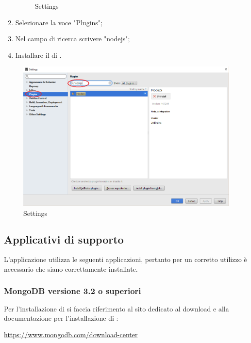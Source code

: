 \documentclass[12pt,a4paper]{article}
\begin{document}
\begin{enumerate}
\begin{center}
\begin{figure}[H]
				\caption{Settings}
			\end{figure}
		\end{center}

		\item Selezionare la voce "Plugins";
		\item Nel campo di ricerca scrivere "nodejs";
		\item Installare il  di .
	\end{enumerate}
	\begin{center}
		\begin{figure}[H]
			\centering
			\includegraphics[max width=\textwidth, scale=0.7]{../img/manualeSviluppatore/plugin.png}
			\caption{Settings}
		\end{figure}
	\end{center}
	
	\subsection{Applicativi di supporto} \label{app_supporto}
		
		L'applicazione \prj{} utilizza le seguenti applicazioni, pertanto per un corretto utilizzo è necessario che siano correttamente installate.
		\subsubsection{MongoDB versione 3.2 o superiori}
		Per l'installazione di  si faccia riferimento al sito dedicato al download e alla documentazione per l'installazione di :
		\begin{center} \url{https://www.mongodb.com/download-center}
		\end{center}
		
\end{document}
